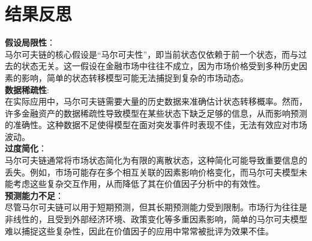\documentclass[a4paper]{article}
\begin{document}
\section{结果反思}
\noindent \textbf{假设局限性}： \\
马尔可夫链的核心假设是“马尔可夫性”，即当前状态仅依赖于前一个状态，而与过去的状态无关。这一假设在金融市场中往往不成立，因为市场价格受到多种历史因素的影响，简单的状态转移模型可能无法捕捉到复杂的市场动态。\\
\noindent \textbf{数据稀疏性}: \\
在实际应用中，马尔可夫链需要大量的历史数据来准确估计状态转移概率。然而，许多金融资产的数据稀疏性导致模型在某些状态下缺乏足够的信息，从而影响预测的准确性。这种数据不足使得模型在面对突发事件时表现不佳，无法有效应对市场波动。\\
\noindent \textbf{过度简化}： \\
马尔可夫链通常将市场状态简化为有限的离散状态，这种简化可能导致重要信息的丢失。例如，市场可能存在多个相互关联的因素影响价格变化，而马尔可夫模型未能考虑这些复杂交互作用，从而降低了其在价值因子分析中的有效性。\\
\noindent \textbf{预测能力不足}： \\
尽管马尔可夫链可以用于短期预测，但其长期预测能力受到限制。市场行为往往是非线性的，且受到外部经济环境、政策变化等多重因素影响，简单的马尔可夫模型难以捕捉这些复杂性，因此在价值因子的应用中常常被批评为效果不佳。\\
\section*{  }
\printbibliography
\end{document}
